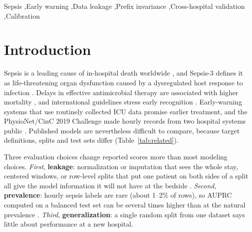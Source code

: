 \documentclass[preprint,12pt]{elsarticle}
\begin{document}
\begin{frontmatter}
\begin{keyword}
Sepsis \sep Early warning \sep Data leakage \sep Prefix invariance \sep Cross-hospital validation \sep Calibration
\end{keyword}

\end{frontmatter}

\section{Introduction}
Sepsis is a leading cause of in-hospital death worldwide \cite{rudd2020}, and Sepsis-3 defines it as life-threatening organ dysfunction caused by a dysregulated host response to infection \cite{singer2016,seymour2016,shankarhari2016}. Delays in effective antimicrobial therapy are associated with higher mortality \cite{kumar2006}, and international guidelines stress early recognition \cite{evans2021}. Early-warning systems that use routinely collected ICU data promise earlier treatment, and the PhysioNet/CinC 2019 Challenge made hourly records from two hospital systems public \cite{reyna2020,goldberger2000}. Published models are nevertheless difficult to compare, because target definitions, splits and test sets differ (Table~\ref{tab:related}).

Three evaluation choices change reported scores more than most modeling choices. \emph{First}, \textbf{leakage}: normalization or imputation that sees the whole stay, centered windows, or row-level splits that put one patient on both sides of a split all give the model information it will not have at the bedside \cite{kaufman2012}. \emph{Second}, \textbf{prevalence}: hourly sepsis labels are rare (about 1--2\% of rows), so AUPRC computed on a balanced test set can be several times higher than at the natural prevalence \cite{saito2015}. \emph{Third}, \textbf{generalization}: a single random split from one dataset says little about performance at a new hospital.
\end{document}
